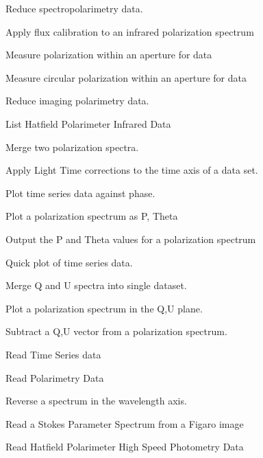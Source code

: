 \begin{mansectionroutines}
        Reduce {} spectropolarimetry data.

        Apply flux calibration to an infrared polarization spectrum

        Measure polarization within an aperture for {} data

        Measure circular polarization within an aperture for {} data

        Reduce {} imaging polarimetry data.

        List Hatfield Polarimeter Infrared Data

        Merge two polarization spectra.

        Apply Light Time corrections to the time axis of a data set.

        Plot time series data against phase.

        Plot a polarization spectrum as P, Theta

        Output the P and Theta values for a polarization spectrum

        Quick plot of time series data.

        Merge Q and U spectra into single dataset.

        Plot a polarization spectrum in the Q,U plane.

        Subtract a Q,U vector from a polarization spectrum.

        Read {} {} Time Series data

        Read {} Polarimetry Data

        Reverse a spectrum in the wavelength axis.

        Read a Stokes Parameter Spectrum from a Figaro image

        Read Hatfield Polarimeter High Speed Photometry Data


\end{mansectionroutines}
